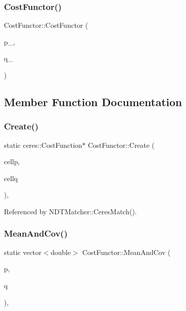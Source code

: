 \subsubsection{\texorpdfstring{Cost\+Functor()}{CostFunctor()}}
{\footnotesize\ttfamily Cost\+Functor\+::\+Cost\+Functor (\begin{DoxyParamCaption}\item[{\hyperlink{classNDTCell}{N\+D\+T\+Cell} $\ast$}]{p\+\_\+,  }\item[{\hyperlink{classNDTCell}{N\+D\+T\+Cell} $\ast$}]{q\+\_\+ }\end{DoxyParamCaption})\hspace{0.3cm}{\ttfamily [inline]}}



\subsection{Member Function Documentation}
\mbox{\label{structCostFunctor_a6f4d3f5dfe5d7c575c1f5dbcc86fed93}} 
\subsubsection{\texorpdfstring{Create()}{Create()}}
{\footnotesize\ttfamily static ceres\+::\+Cost\+Function$\ast$ Cost\+Functor\+::\+Create (\begin{DoxyParamCaption}\item[{\hyperlink{classNDTCell}{N\+D\+T\+Cell} $\ast$}]{cellp,  }\item[{\hyperlink{classNDTCell}{N\+D\+T\+Cell} $\ast$}]{cellq }\end{DoxyParamCaption})\hspace{0.3cm}{\ttfamily [inline]}, {\ttfamily [static]}}



Referenced by N\+D\+T\+Matcher\+::\+Ceres\+Match().

\mbox{\label{structCostFunctor_ae875000950da1578f746dc343af34c94}} 
\subsubsection{\texorpdfstring{Mean\+And\+Cov()}{MeanAndCov()}}
{\footnotesize\ttfamily static vector$<$double$>$ Cost\+Functor\+::\+Mean\+And\+Cov (\begin{DoxyParamCaption}\item[{\hyperlink{classNDTCell}{N\+D\+T\+Cell} $\ast$}]{p,  }\item[{\hyperlink{classNDTCell}{N\+D\+T\+Cell} $\ast$}]{q }\end{DoxyParamCaption})\hspace{0.3cm}{\ttfamily [inline]}, {\ttfamily [static]}}

